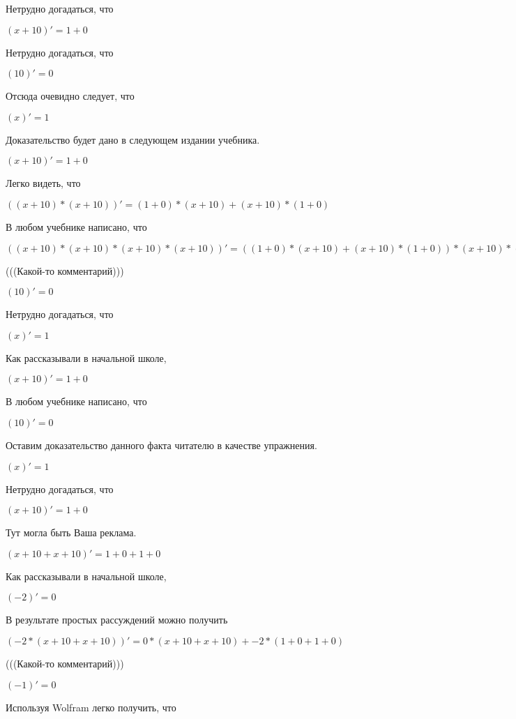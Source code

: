 \documentclass[12pt,a4paper,fleqn]{article}
\theoremstyle{definition}
\begin{document}
Нетрудно догадаться, что

$( x  +  10 )' =  1  +  0 $

Нетрудно догадаться, что

$( 10 )' =  0 $

Отсюда очевидно следует, что

$( x )' =  1 $

Доказательство будет дано в следующем издании учебника.

$( x  +  10 )' =  1  +  0 $

Легко видеть, что

$(( x  +  10 ) * ( x  +  10 ))' = ( 1  +  0 ) * ( x  +  10 ) + ( x  +  10 ) * ( 1  +  0 )$

В любом учебнике написано, что

$(( x  +  10 ) * ( x  +  10 ) * ( x  +  10 ) * ( x  +  10 ))' = (( 1  +  0 ) * ( x  +  10 ) + ( x  +  10 ) * ( 1  +  0 )) * ( x  +  10 ) * ( x  +  10 ) + ( x  +  10 ) * ( x  +  10 ) * (( 1  +  0 ) * ( x  +  10 ) + ( x  +  10 ) * ( 1  +  0 ))$

(((Какой-то комментарий)))

$( 10 )' =  0 $

Нетрудно догадаться, что

$( x )' =  1 $

Как рассказывали в начальной школе,

$( x  +  10 )' =  1  +  0 $

В любом учебнике написано, что

$( 10 )' =  0 $

Оставим доказательство данного факта читателю в качестве упражнения.

$( x )' =  1 $

Нетрудно догадаться, что

$( x  +  10 )' =  1  +  0 $

Тут могла быть Ваша реклама.

$( x  +  10  +  x  +  10 )' =  1  +  0  +  1  +  0 $

Как рассказывали в начальной школе,

$( -2 )' =  0 $

В результате простых рассуждений можно получить

$( -2  * ( x  +  10  +  x  +  10 ))' =  0  * ( x  +  10  +  x  +  10 ) +  -2  * ( 1  +  0  +  1  +  0 )$

(((Какой-то комментарий)))

$( -1 )' =  0 $

Используя Wolfram легко получить, что
\end{document}
